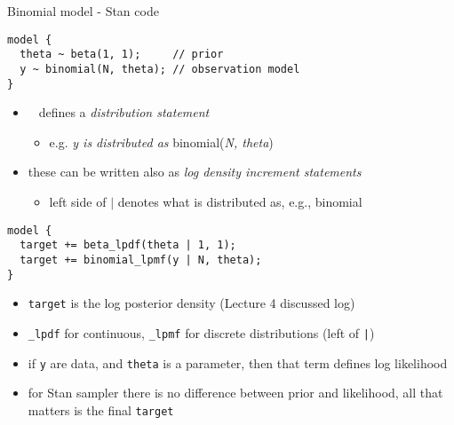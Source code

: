 \documentclass[finnish,english,t]{beamer}
\begin{document}
\begin{frame}[fragile]{Binomial model - Stan code}

  \vspace{-\baselineskip}
  {\small
\begin{verbatim}
model {
  theta ~ beta(1, 1);     // prior
  y ~ binomial(N, theta); // observation model
}
\end{verbatim}
  }

    \vspace{-0.5\baselineskip}
    \begin{itemize}
    \item \texttt{~} defines a \textit{distribution statement}
      \begin{itemize}
      \item[] e.g. \textit{y is distributed as} binomial(\textit{N, theta})
      \end{itemize}
    \item<2-> these can be written also as \textit{log density increment statements}
      \begin{itemize}
      \item[] left side of $|$ denotes what is distributed as, e.g., binomial
      \end{itemize}
    \end{itemize}

    \pause
    \vspace{-0.5\baselineskip}
  {\small
\begin{verbatim}
model {
  target += beta_lpdf(theta | 1, 1);
  target += binomial_lpmf(y | N, theta);
}
\end{verbatim}
  }

    \vspace{-0.5\baselineskip}
    \begin{itemize}
    \item<3-> {\tt target} is the log posterior density (Lecture 4 discussed log)
    \item<4-> {\tt \_lpdf} for continuous, {\tt \_lpmf} for discrete distributions (left of {\tt |})
    \item<5-> if \texttt{y} are data, and \texttt{theta} is a parameter, then that term defines log likelihood
    \item<6-> for Stan sampler there is no difference between prior and likelihood, all that matters is the final {\tt target}
    \end{itemize}

\end{frame} 
\end{document}
